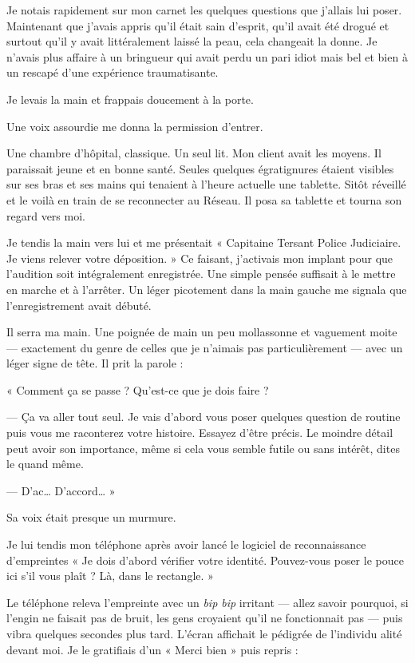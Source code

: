Je notais rapidement sur mon carnet les quelques questions que j'allais lui poser. Maintenant que j'avais appris qu'il
était sain d'esprit, qu'il avait été drogué et surtout qu'il y avait littéralement laissé la peau, cela changeait la 
donne. Je n'avais plus affaire à un bringueur qui avait perdu un pari idiot mais bel et bien à un rescapé d'une 
expérience traumatisante.

Je levais la main et frappais doucement à la porte.

Une voix assourdie me donna la permission d'entrer.

Une chambre d'hôpital, classique. Un seul lit. Mon client avait les moyens. Il paraissait jeune et en bonne santé.
Seules quelques égratignures étaient visibles sur ses bras et ses mains qui tenaient à l'heure actuelle une tablette.
Sitôt réveillé et le voilà en train de se reconnecter au Réseau. Il posa sa tablette et tourna son regard vers moi.

Je tendis la main vers lui et me présentait « Capitaine Tersant Police Judiciaire. Je viens relever votre déposition. » 
Ce faisant, j'activais mon implant pour que l'audition soit intégralement enregistrée. Une simple pensée suffisait à le 
mettre en marche et à l'arrêter. Un léger picotement dans la main gauche me signala que l'enregistrement avait débuté.

Il serra ma main. Une poignée de main un peu mollassonne et vaguement moite — exactement du genre de celles que je
n'aimais pas particulièrement — avec un léger signe de tête. Il prit la parole :

« Comment ça se passe ? Qu'est-ce que je dois faire ?

— Ça va aller tout seul. Je vais d'abord vous poser quelques question de routine puis vous me raconterez votre
histoire. Essayez d'être précis. Le moindre détail peut avoir son importance, même si cela vous semble futile ou sans
intérêt, dites le quand même.

— D'ac… D'accord… »

Sa voix était presque un murmure.

Je lui tendis mon téléphone après avoir lancé le logiciel de reconnaissance d'empreintes « Je dois d'abord vérifier
votre identité. Pouvez-vous poser le pouce ici s'il vous plaît ? Là, dans le rectangle. »

Le téléphone releva l'empreinte avec un \emph{bip bip} irritant — allez savoir pourquoi, si l'engin ne faisait pas de
bruit, les gens croyaient qu'il ne fonctionnait pas — puis vibra quelques secondes plus tard. L'écran affichait le
pédigrée de l'individu alité devant moi. Je le gratifiais d'un « Merci bien » puis repris :

